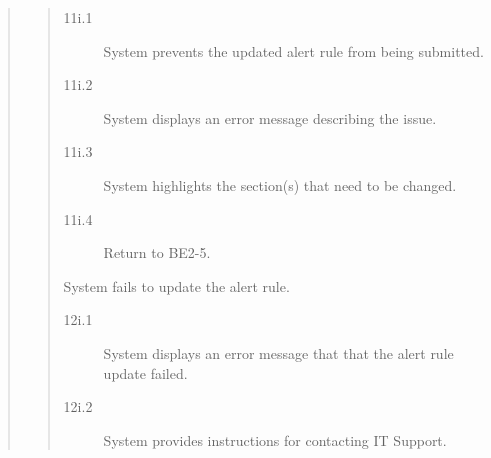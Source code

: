\documentclass[]{article}
\begin{document}
\begin{enumerate}[{\bf BE2.}]
\begin{quote}
\begin{quote}
\begin{description}
                        \begin{description}
                            \item[\textmd{11i.1}] System prevents the updated alert rule from being submitted.
                            \item[\textmd{11i.2}] System displays an error message describing the issue.
                            \item[\textmd{11i.3}] System highlights the section(s) that need to be changed.
                            \item[\textmd{11i.4}] Return to BE2-5.
                        \end{description}
                        \item[\textmd{12i.}] System fails to update the alert rule.
                        \begin{description}
                            \item[\textmd{12i.1}] System displays an error message that that the alert rule update failed.
                            \item[\textmd{12i.2}] System provides instructions for contacting IT Support.
                        \end{description}
                    \end{description}
                \end{quote}
        	\end{quote}
\end{enumerate}
\end{document}
